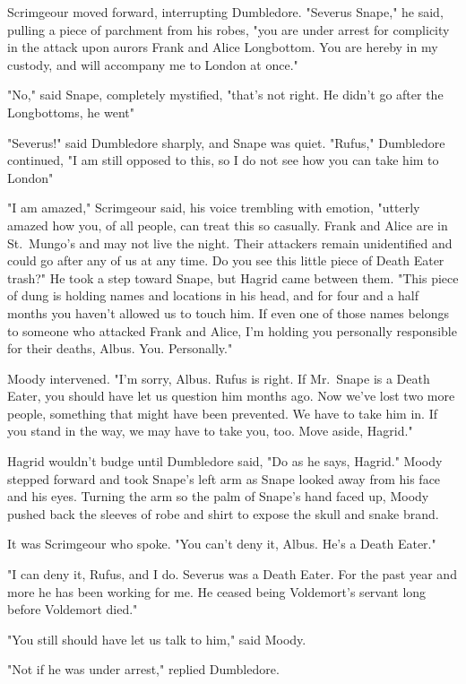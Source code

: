 Scrimgeour moved forward, interrupting Dumbledore. "Severus Snape," he said, pulling a piece of parchment from his robes, "you are under arrest for complicity in the attack upon aurors Frank and Alice Longbottom. You are hereby in my custody, and will accompany me to London at once."

"No," said Snape, completely mystified, "that's not right. He didn't go after the Longbottoms, he went{\el}"

"Severus!" said Dumbledore sharply, and Snape was quiet. "Rufus," Dumbledore continued, "I am still opposed to this, so I do not see how you can take him to London{\el}"

"I am amazed," Scrimgeour said, his voice trembling with emotion, "utterly amazed how you, of all people, can treat this so casually. Frank and Alice are in St.~Mungo's and may not live the night. Their attackers remain unidentified and could go after any of us at any time. Do you see this little piece of Death Eater trash?" He took a step toward Snape, but Hagrid came between them. "This piece of dung is holding names and locations in his head, and for four and a half months you haven't allowed us to touch him. If even one of those names belongs to someone who attacked Frank and Alice, I'm holding you personally responsible for their deaths, Albus. You. Personally."

Moody intervened. "I'm sorry, Albus. Rufus is right. If Mr.~Snape is a Death Eater, you should have let us question him months ago. Now we've lost two more people, something that might have been prevented. We have to take him in. If you stand in the way, we may have to take you, too. Move aside, Hagrid."

Hagrid wouldn't budge until Dumbledore said, "Do as he says, Hagrid." Moody stepped forward and took Snape's left arm as Snape looked away from his face and his eyes. Turning the arm so the palm of Snape's hand faced up, Moody pushed back the sleeves of robe and shirt to expose the skull and snake brand.

It was Scrimgeour who spoke. "You can't deny it, Albus. He's a Death Eater."

"I can deny it, Rufus, and I do. Severus was a Death Eater. For the past year and more he has been working for me. He ceased being Voldemort's servant long before Voldemort died."

"You still should have let us talk to him," said Moody.

"Not if he was under arrest," replied Dumbledore.

